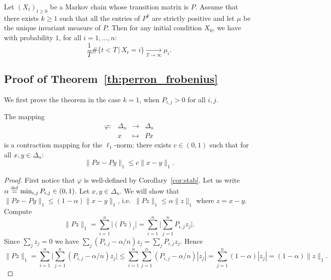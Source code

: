 \documentclass[11pt,nocut]{article}
\begin{document}
\begin{theorem}\label{th:ergodic}
	Let $(X_t)_{t \geq 0}$ be a Markov chain whose transition matrix is $P$.
	Assume that there exists $k \geq 1$ such that all the entries of $P^k$ are strictly positive and let $\mu$ be the unique invariant measure of $P$. Then for any initial condition $X_0$, we have with probability $1$, for all $i=1, \dots, n$:
	$$
	\frac{1}{T} \# \big\{ t < T \, \big| \, X_t = i \big\}
	\xrightarrow[T \to \infty]{} \mu_i.
	$$
\end{theorem}


\subsection{Proof of Theorem~\ref{th:perron_frobenius}}
We first prove the theorem in the case $k=1$, when $P_{i,j} > 0$ for all $i,j$.
\begin{lemma}\label{lem:contract}
	The mapping 
	$$
	\begin{array}{cccc}
		\varphi:& \Delta_n &\to& \Delta_n \\
				& x & \mapsto & Px
	\end{array}
	$$
	is a contraction mapping for the $\ell_1$-norm: there exists $c \in (0,1)$ such that for all $x,y \in \Delta_n$:
	$$
	\| Px - Py \|_1 \leq c \| x-y\|_1.
	$$
\end{lemma}
\begin{proof}
	First notice that $\varphi$ is well-defined by Corollary~\ref{cor:stab}.
	Let us write $\alpha \overset{\rm def}{=} \min_{i,j} P_{i,j} \in (0,1)$.
	Let $x,y \in \Delta_n$. We will show that $\| Px - Py \|_1 \leq (1-\alpha) \| x-y\|_1$, i.e.\ $\|P z\|_1 \leq \alpha \|z\|_1$ where $z = x-y$. Compute
	$$
	\| P z\|_1 
	= \sum_{i=1}^n \big| (Pz)_i \big|
	= \sum_{i=1}^n \Big| \sum_{j=1}^n P_{i,j}z_j \Big|.
	$$
	Since $\sum_{j} z_j = 0$ we have $\sum_j (P_{i,j} - \alpha/n) z_j = \sum_j P_{i,j} z_j$. Hence
	$$
	\| P z\|_1 
	= \sum_{i=1}^n \Big| \sum_{j=1}^n (P_{i,j} - \alpha/n) z_j \Big|
	\leq \sum_{i=1}^n \sum_{j=1}^n (P_{i,j} - \alpha/n) |z_j| 
	= \sum_{j=1}^n (1-\alpha) |z_j|
	= (1-\alpha) \|z\|_1.
	$$
\end{proof}
\end{document}
